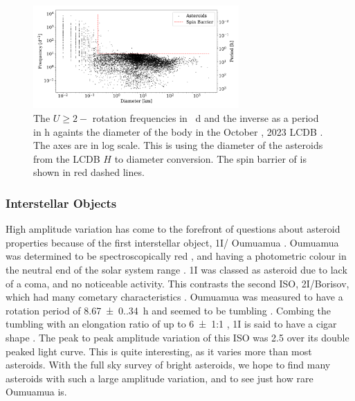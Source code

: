 \documentclass{UCreport}
\DeclareRobustCommand{\okina}{%
  \raisebox{\dimexpr\fontcharht\font`A-\height}{%
    \scalebox{0.8}{`}%
  }%
}
\newcommand{\omuamua}{\okina Oumuamua }
\begin{document}
\begin{figure}[t!]
  \centering
  \includegraphics[width=0.7\textwidth]{../Test Code/Testing Figures/Diam-FreqPlot.pdf}
  \caption[Asteroid frequencies vs diameter (LCDB)]{The $U\geq 2-$ rotation frequencies in \unit{\per\day} and the inverse as a period in \unit{\hour} againts the diameter of the body in the October , 2023 LCDB \citet{Warner2009}.
  The axes are in log scale. 
  This is using the diameter of the asteroids from the LCDB $H$ to diameter conversion. 
  The spin barrier of \citet{Pravec2000} is shown in red dashed lines.
  }
  \label{Fig:FreqVsDiam}
\end{figure}

\subsubsection*{Interstellar Objects}
High amplitude variation has come to the forefront of questions about asteroid properties because of the first interstellar object, 1I/\omuamua \citep[see][for a review]{Bannister2019}.
\omuamua was determined to be spectroscopically red \citep{Fitzsimmons2017, Meech2017}, and having a photometric colour in the neutral end of the solar system range \citep{Bannister2017}.
1I was classed as asteroid due to lack of a coma, and no noticeable activity.
This contrasts the second ISO, 2I/Borisov, which had many cometary characteristics \citep[see ][for a review]{Dorofeeva2023}. %
\omuamua was measured to have a rotation period of \qty{8.67(0.34)}{\hour} \citep{Belton2018} and seemed to be tumbling \citep[e.g.][]{Drahus2018,Fraser2018}.
Combing the tumbling with an elongation ratio of up to \qty{6(1)}{}:1 \citep{McNeill2018}, 1I is said to have a cigar shape \citep{Belton2018}.
The peak to peak amplitude variation of this ISO was \qty{2.5}{\mag} \citep{Meech2017} over its double peaked light curve.
This is quite interesting, as it varies more than most asteroids.
With the full sky survey of bright asteroids, we hope to find many asteroids with such a large amplitude variation, and to see just how rare \omuamua is.
\end{document}
